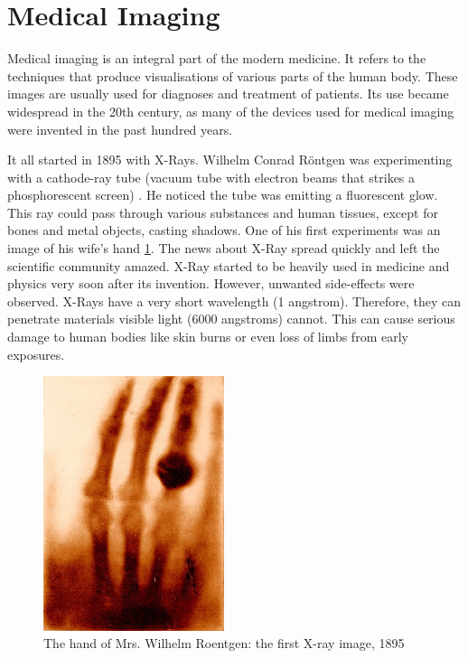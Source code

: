 \section{Medical Imaging}
Medical imaging is an integral part of the modern medicine. It refers to the techniques that produce visualisations of various parts of the human body. These images are usually used for diagnoses and treatment of patients. Its use became widespread in the 20th century, as many of the devices used for medical imaging were invented in the past hundred years.  

 It all started in 1895 with X-Rays. Wilhelm Conrad Röntgen was experimenting with a cathode-ray tube (vacuum tube with electron beams that strikes a phosphorescent screen) \cite{glasser1993}. He noticed the tube was emitting a fluorescent glow. This ray could pass through various substances and human tissues, except for bones and metal objects, casting shadows. One of his first experiments was an image of his wife's hand \ref{fig:first-rtg}. The news about X-Ray spread quickly and left the scientific community amazed. X-Ray started to be heavily used in medicine and physics very soon after its invention. However, unwanted side-effects were observed. X-Rays have a very short wavelength (1 angstrom). Therefore, they can penetrate materials visible light (6000 angstroms) cannot. This can cause serious damage to human bodies like skin burns or even loss of limbs from early exposures. 
 
\begin{figure}[ht]
    \centering
    \includegraphics[width=150pt]{images/first-rtg.jpg}
    \caption[The hand of Mrs. Wilhelm Roentgen: the first X-ray image, 1895]{The hand of Mrs. Wilhelm Roentgen: the first X-ray image, 1895 \cite{glasser1993}}
    \label{fig:first-rtg}
\end{figure}

